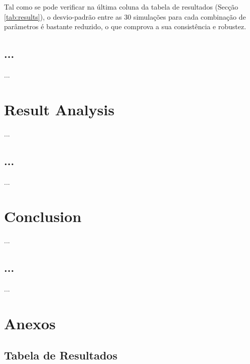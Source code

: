 \documentclass[a4paper]{article}
\begin{document}
Tal como se pode verificar na última coluna da tabela de resultados (Secção \ref{tab:results}), o desvio-padrão entre as 30 simulações para cada combinação de parâmetros
é bastante reduzido, o que comprova a sua consistência e robustez.

\cleardoublepage

\subsection{...}
\indent \indent ...

\cleardoublepage

\section{Result Analysis}
\indent \indent ...

\cleardoublepage

\subsection{...}
\indent \indent ...

\cleardoublepage
\section{Conclusion}
\indent \indent ...

\cleardoublepage

\subsection{...}
\indent \indent ...

\cleardoublepage
\section{Anexos}

\eject \pdfpagewidth=594.0mm \pdfpageheight=420.0mm

\subsection{Tabela de Resultados}
\begin{center}
	
\end{center}
\end{document}
